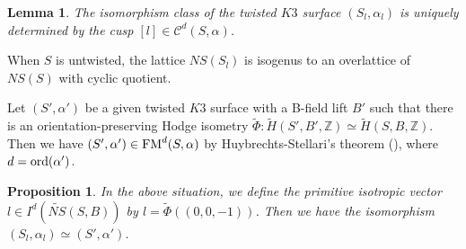 \documentclass{article}
\theoremstyle{plain}
\newtheorem{proposition}[theorem]{Proposition}%
\newtheorem{lemma}[theorem]{Lemma}%
\theoremstyle{definition}
\theoremstyle{remark}
\newcommand{\Z}{{\mathbb Z}}
\begin{document}
\begin{lemma}\label{well-defined}
The isomorphism class of 
the twisted $K3$ surface $(S_{l}, \alpha _{l})$ 
is uniquely determined by   
the cusp $[l] \in \mathcal{C}^{d}(S, \alpha ) $. 
\end{lemma}






When $S$ is untwisted,  
the lattice $NS(S_{l})$ is isogenus to an overlattice of $NS(S)$ with cyclic quotient.










Let $(S', \alpha ')$ be a given twisted $K3$ surface 
with a B-field lift $B'$ 
such that 
there is an orientation-preserving Hodge isometry 
$\widetilde{\Phi} : 
\widetilde{H}(S', B', {\Z}) \simeq \widetilde{H}(S, B, {\Z})$. 
Then 
we have 
$(S', \alpha ') \in {\rm FM\/}^{d}(S, \alpha )$ 
by Huybrechts-Stellari's theorem (\cite{H-S2}), 
where 
$d={\rm ord\/}(\alpha ')$. 









\begin{proposition}\label{key prop}
In the above situation, 
we define the primitive isotropic vector 
$l \in I^{d}(\widetilde{NS}(S, B))$ by 
$l = \widetilde{\Phi} ((0, 0, -1))$. 
Then we have the isomorphism 
$(S_{l}, \alpha _{l}) \simeq (S', \alpha ')$. 
\end{proposition}
\end{document}
